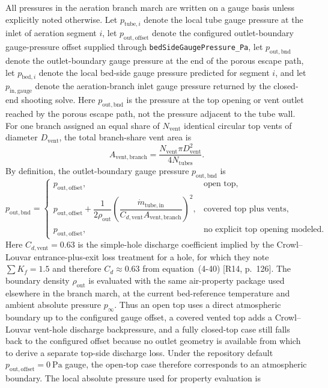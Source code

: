 \documentclass[11pt]{article}
\newcommand{\code}[1]{\nolinkurl{#1}}
\begin{document}
All pressures in the aeration branch march are written on a gauge basis unless explicitly noted otherwise. Let \(p_{\mathrm{tube},i}\) denote the local tube gauge pressure at the inlet of aeration segment \(i\), let \(p_{\mathrm{out,offset}}\) denote the configured outlet-boundary gauge-pressure offset supplied through \code{bedSideGaugePressure\_Pa}, let \(p_{\mathrm{out,bnd}}\) denote the outlet-boundary gauge pressure at the end of the porous escape path, let \(p_{\mathrm{bed},i}\) denote the local bed-side gauge pressure predicted for segment \(i\), and let \(p_{\mathrm{in,gauge}}\) denote the aeration-branch inlet gauge pressure returned by the closed-end shooting solve. Here \(p_{\mathrm{out,bnd}}\) is the pressure at the top opening or vent outlet reached by the porous escape path, not the pressure adjacent to the tube wall. For one branch assigned an equal share of \(N_{\mathrm{vent}}\) identical circular top vents of diameter \(D_{\mathrm{vent}}\), the total branch-share vent area is
\begin{equation}
\label{eq:vent_branch_area}
A_{\mathrm{vent,branch}}=
\frac{N_{\mathrm{vent}}\pi D_{\mathrm{vent}}^2}{4N_{\mathrm{tubes}}}.
\end{equation}
By definition, the outlet-boundary gauge pressure \(p_{\mathrm{out,bnd}}\) is
\begin{equation}
\label{eq:outlet_boundary_closure}
p_{\mathrm{out,bnd}}=
\begin{cases}
p_{\mathrm{out,offset}}, & \text{open top},\\[6pt]
p_{\mathrm{out,offset}}+\dfrac{1}{2\rho_{\mathrm{out}}}
\left(\dfrac{\dot m_{\mathrm{tube,in}}}{C_{d,\mathrm{vent}}A_{\mathrm{vent,branch}}}\right)^2, & \text{covered top plus vents},\\[10pt]
p_{\mathrm{out,offset}}, & \text{no explicit top opening modeled}.
\end{cases}
\end{equation}
Here \(C_{d,\mathrm{vent}}=0.63\) is the simple-hole discharge coefficient implied by the Crowl--Louvar entrance-plus-exit loss treatment for a hole, for which they note \(\sum K_f=1.5\) and therefore \(C_d\approx0.63\) from equation~(4-40) [R14, p.~126]. The boundary density \(\rho_{\mathrm{out}}\) is evaluated with the same air-property package used elsewhere in the branch march, at the current bed-reference temperature and ambient absolute pressure \(p_\infty\). Thus an open top uses a direct atmospheric boundary up to the configured gauge offset, a covered vented top adds a Crowl--Louvar vent-hole discharge backpressure, and a fully closed-top case still falls back to the configured offset because no outlet geometry is available from which to derive a separate top-side discharge loss. Under the repository default \(p_{\mathrm{out,offset}}=\SI{0}{\pascal}\) gauge, the open-top case therefore corresponds to an atmospheric boundary. The local absolute pressure used for property evaluation is
\end{document}
